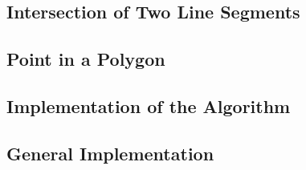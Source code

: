 \subsection{Intersection of Two Line Segments}

\subsection{Point in a Polygon}

\subsection{Implementation of the Algorithm}

\subsection{General Implementation}

